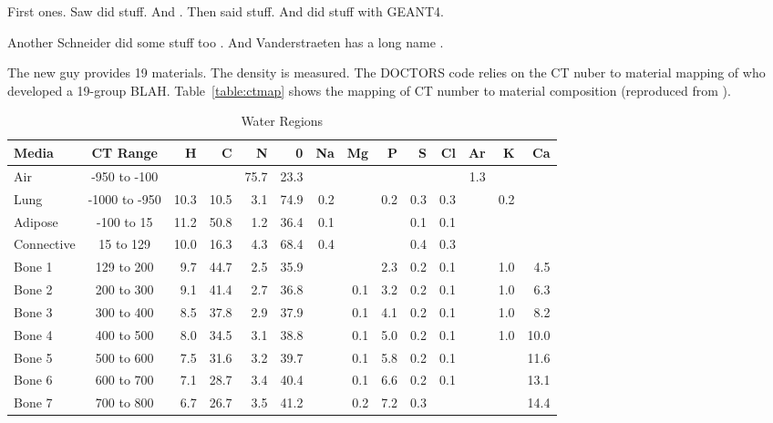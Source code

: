 First ones.
Saw \citep{ref:sawc} did stuff. And \citep{ref:plessisf}. Then \citet{ref:schneideru} said stuff. And \citet{ref:kimh} did stuff with GEANT4.

Another Schneider did some stuff too \citep{ref:schneiderw}. And Vanderstraeten has a long name \citep{ref:vanderstraetenb}.

The new guy provides 19 materials. The density is measured.
The DOCTORS code relies on the CT nuber to material mapping of \citet{ref:ottossonr} who developed a 19-group BLAH. Table~\ref{table:ctmap} shows the mapping of CT number to material composition (reproduced from \citep{ref:ottossonr}).

\begin{table}[ht]
\caption{Water Regions}
\centering 
\begin{tabular}{l c r r r r r r r r r r r r}
\hline \hline   
Media       & CT Range      & H    & C    & N    & 0    & Na  & Mg  & P    & S   & Cl  & Ar  & K   & Ca \\ [0.5ex] 
\hline
Air         & -950 to -100  &      &      & 75.7 & 23.3 &     &     &      &     &     & 1.3 &     &      \\
Lung        & -1000 to -950 & 10.3 & 10.5 &  3.1 & 74.9 & 0.2 &     &  0.2 & 0.3 & 0.3 &     & 0.2 &      \\
Adipose     & -100 to 15    & 11.2 & 50.8 &  1.2 & 36.4 & 0.1 &     &      & 0.1 & 0.1 &     &     &      \\
Connective  & 15 to 129     & 10.0 & 16.3 &  4.3 & 68.4 & 0.4 &     &      & 0.4 & 0.3 &     &     &      \\
Bone 1      & 129 to 200    &  9.7 & 44.7 &  2.5 & 35.9 &     &     &  2.3 & 0.2 & 0.1 &     & 1.0 &  4.5 \\ 
Bone 2      & 200 to 300    &  9.1 & 41.4 &  2.7 & 36.8 &     & 0.1 &  3.2 & 0.2 & 0.1 &     & 1.0 &  6.3 \\ 
Bone 3      & 300 to 400    &  8.5 & 37.8 &  2.9 & 37.9 &     & 0.1 &  4.1 & 0.2 & 0.1 &     & 1.0 &  8.2 \\ 
Bone 4      & 400 to 500    &  8.0 & 34.5 &  3.1 & 38.8 &     & 0.1 &  5.0 & 0.2 & 0.1 &     & 1.0 & 10.0 \\ 
Bone 5      & 500 to 600    &  7.5 & 31.6 &  3.2 & 39.7 &     & 0.1 &  5.8 & 0.2 & 0.1 &     &     & 11.6 \\ 
Bone 6      & 600 to 700    &  7.1 & 28.7 &  3.4 & 40.4 &     & 0.1 &  6.6 & 0.2 & 0.1 &     &     & 13.1 \\ 
Bone 7      & 700 to 800    &  6.7 & 26.7 &  3.5 & 41.2 &     & 0.2 &  7.2 & 0.3 &     &     &     & 14.4 \\ 

\end{tabular}
\end{table}
